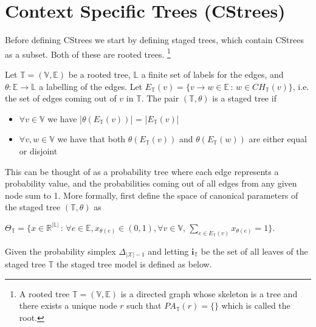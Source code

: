 \documentclass{tufte-book}
\begin{document}
\section{Context Specific Trees (CStrees)}
\label{sec:org9ac2e72}
Before defining CStrees we start by defining staged trees, which contain CStrees as a subset. Both of these are rooted trees.  \footnote{A rooted tree $\mathbb{T} = (\mathbb{V},\mathbb{E})$ is a directed graph whose skeleton is a tree and there exists a unique node $r$ such that $PA_{\mathbb{T}}(r) = \{\}$ which is called the root.} 
   \begin{definition}
   Let $\mathbb{T} = (\mathbb{V},\mathbb{E})$ be a rooted tree, $\mathbb{L}$ a finite set of labels for the edges, and $\theta : \mathbb{E} \rightarrow \mathbb{L}$ a labelling of the edges. Let $E_{\mathbb{T}}(v) = \{v \rightarrow w \in \mathbb{E} \,:\, w \in CH_{\mathbb{T}}(v) \}$,   i.e. the set of edges coming out of $v$ in $\mathbb{T}$. The pair $(\mathbb{T}, \theta)$ is a staged tree if 
\begin{itemize}
\item  $\forall v \in \mathbb{V}$ we have |$\theta(E_{\mathbb{T}}(v))$| = |$E_{\mathbb{T}}(v)$|
\item $\forall v,w \in \mathbb{V}$ we have that both $\theta(E_\mathbb{T}(v))$ and $\theta(E_\mathbb{T}(w))$ are either equal or disjoint
\end{itemize}
\end{definition}

This can be thought of as a probability tree where each edge represents a probability value, and the probabilities coming out of all edges from any given node sum to 1. More formally, first define the space of canonical parameters of the staged tree \((\mathbb{T},\theta)\) as

$\Theta_{\mathbb{T}} = \{  x\in \mathbb{R}^{|\mathbb{L}|} \, : \, \forall e \in \mathbb{E}, x_{\theta(e)}\in (0,1), \forall v \in \mathbb{V}, \, \sum_{e \in E_{\mathbb{T}}(v)} x_{\theta(e)}=1 \}$.

Given the probability simplex \(\Delta_{|\mathcal{X}|-1}\) and letting \(\mathbf{i}_{\mathbb{T}}\) be the set of all leaves of the staged tree \(\mathbb{T}\)  the staged tree model is defined as below.
\end{document}
